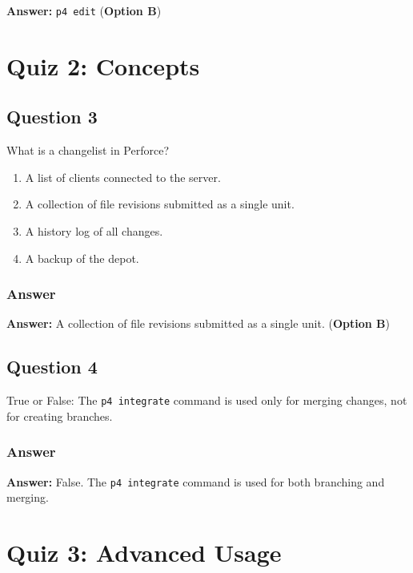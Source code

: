 \documentclass{article}
\begin{document}
\textbf{Answer:} \texttt{p4 edit} (\textbf{Option B})

\hrulefill

\section*{Quiz 2: Concepts}

\subsection*{Question 3}

What is a changelist in Perforce?

\begin{enumerate}
    \item A list of clients connected to the server.
    \item A collection of file revisions submitted as a single unit.
    \item A history log of all changes.
    \item A backup of the depot.
\end{enumerate}

\subsubsection*{Answer}

\textbf{Answer:} A collection of file revisions submitted as a single unit. (\textbf{Option B})

\hrulefill

\subsection*{Question 4}

True or False: The \texttt{p4 integrate} command is used only for merging changes, not for creating branches.

\subsubsection*{Answer}

\textbf{Answer:} False. The \texttt{p4 integrate} command is used for both branching and merging.

\hrulefill

\section*{Quiz 3: Advanced Usage}
\end{document}
